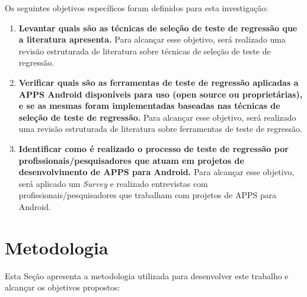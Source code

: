 Os seguintes objetivos específicos foram definidos para esta investigação:

\begin{enumerate}[label=\bf O\arabic*,leftmargin=1.5cm]

    \item \textbf{Levantar quais são as técnicas de seleção de teste de regressão que a literatura apresenta.} Para alcançar esse objetivo, será realizado uma revisão estruturada de literatura sobre técnicas de seleção de teste de regressão.
    
    \item \textbf{Verificar quais são as ferramentas de teste de regressão aplicadas a \ac{APPS} Android disponíveis para uso (open source ou proprietárias), e se as mesmas foram implementadas baseadas nas técnicas de seleção de teste de regressão.} Para alcançar esse objetivo, será realizado uma revisão estruturada de literatura sobre ferramentas de teste de regressão.
    
    \item \textbf{Identificar como é realizado o processo de teste de regressão por profissionais/pesquisadores que atuam em projetos de desenvolvimento de \ac{APPS} para Android.} Para alcançar esse objetivo, será aplicado um \textit{Survey} e realizado entrevistas com profissionais/pesquisadores que trabalham com projetos de \ac{APPS} para Android.


\end{enumerate}



\section{Metodologia}\label{sec:metodologia}


Esta Seção apresenta a metodologia utilizada para desenvolver este trabalho e alcançar os objetivos propostos:


